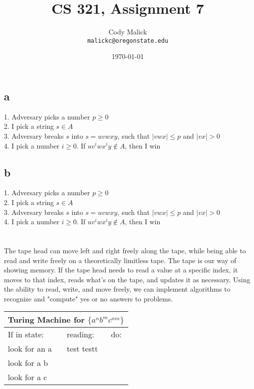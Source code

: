 \documentclass[10pt,letterpaper]{article}
\begin{document}
  \title{CS 321, Assignment 7}
  \author{Cody Malick\\
  \texttt{malickc@oregonstate.edu}}
  \date{\today}
  \maketitle

\section{}
\subsection*{a}
1. Adversary picks a number $p \geq 0$\\
2. I pick a string $s \in A$ \\
3. Adversary breaks $s$ into $s = uvwxy$, such that $|vwx| \leq p$ and $|vx| > 0$\\
4. I pick a number $i \geq 0$. If $uv^iwx^iy \notin A$, then I win

\subsection*{b}
1. Adversary picks a number $p \geq 0$\\
2. I pick a string $s \in A$ \\
3. Adversary breaks $s$ into $s = uvwxy$, such that $|vwx| \leq p$ and $|vx| > 0$\\
4. I pick a number $i \geq 0$. If $uv^iwx^iy \notin A$, then I win

\section{}
The tape head can move left and right freely along the tape, while being able
to read and write freely on a theoretically limitless tape. The tape is our way
of showing memory. If the tape head needs to read a value at a specific index,
it moves to that index, reads what's on the tape, and updates it as necessary.
Using the ability to read, write, and move freely, we can implement algorithms
to recognize and "compute" yes or no answers to problems. \\

\begin{center}
	\begin{tabular}{ | p{6cm} | p{6cm} | p{6cm} | }
		\hline
		\multicolumn{3}{|c|}{Turing Machine for $\{a^nb^mc^{nm}\}$} \\
		\hline
		If in state: & reading: & do: \\ \hline
		look for an a & test \newline testt& \\ \hline
		look for a b & & \\ \hline
		look for a c & & \\ \hline


\end{tabular}
\end{center}
\end{document}
